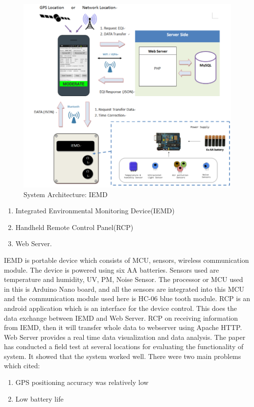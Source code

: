 \documentclass[11pt]{article}
\begin{document}
\begin{figure}[h!]
  \centering
  \hspace*{-1.25cm}   
\includegraphics[scale=0.34]{images/fig1.png}
  \hspace*{-1.25cm}
  \caption{System Architecture: IEMD}
  \label{arch}
\end{figure}


\begin{enumerate}
\item	Integrated Environmental Monitoring Device(IEMD)
\item	Handheld Remote Control Panel(RCP)
\item	Web Server.
\end{enumerate}

 
IEMD is portable device which consists of MCU, sensors, wireless communication module. The device is powered using six AA batteries. Sensors used are temperature and humidity, UV, PM, Noise Sensor.
The processor or MCU used in this is Arduino Nano board, and all the sensors are integrated into this MCU and the communication module used here is HC-06 blue tooth module.
RCP is an android application which is an interface for the device control. This does the data exchange between IEMD and Web Server. RCP on receiving information from IEMD, then it will transfer whole data to webserver using Apache HTTP.
Web Server provides a real time data visualization and data analysis. The paper has conducted a field test at several locations for evaluating the functionality of system. It showed that the system worked well. There were two main problems which cited:
\begin{enumerate}
\item GPS positioning accuracy was relatively low
\item Low battery life

\end{enumerate}
\end{document}
